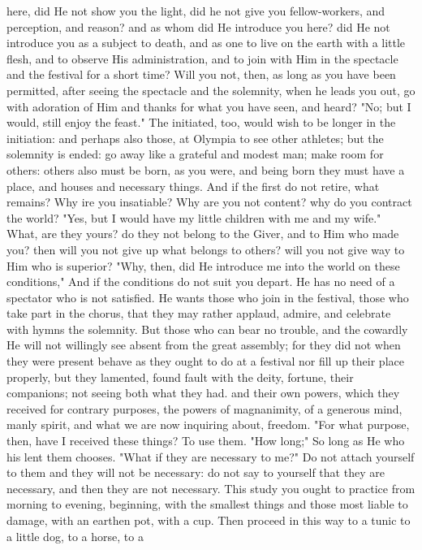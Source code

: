 \documentclass[a4paper]{article}
\begin{document}
here, did He not show you the light, did he not give you fellow-workers, and
perception, and reason? and as whom did He introduce you here? did He not
introduce you as a subject to death, and as one to live on the earth with a
little flesh, and to observe His administration, and to join with Him in the
spectacle and the festival for a short time? Will you not, then, as long as you
have been permitted, after seeing the spectacle and the solemnity, when he
leads you out, go with adoration of Him and thanks for what you have seen, and
heard? "No; but I would, still enjoy the feast." The initiated, too, would wish
to be longer in the initiation: and perhaps also those, at Olympia to see other
athletes; but the solemnity is ended: go away like a grateful and modest man;
make room for others: others also must be born, as you were, and being born
they must have a place, and houses and necessary things. And if the first do
not retire, what remains? Why ire you insatiable? Why are you not content? why
do you contract the world? "Yes, but I would have my little children with me
and my wife." What, are they yours? do they not belong to the Giver, and to Him
who made you? then will you not give up what belongs to others? will you not
give way to Him who is superior? "Why, then, did He introduce me into the world
on these conditions," And if the conditions do not suit you depart. He has no
need of a spectator who is not satisfied. He wants those who join in the
festival, those who take part in the chorus, that they may rather applaud,
admire, and celebrate with hymns the solemnity. But those who can bear no
trouble, and the cowardly He will not willingly see absent from the great
assembly; for they did not when they were present behave as they ought to do at
a festival nor fill up their place properly, but they lamented, found fault
with the deity, fortune, their companions; not seeing both what they had. and
their own powers, which they received for contrary purposes, the powers of
magnanimity, of a generous mind, manly spirit, and what we are now inquiring
about, freedom. "For what purpose, then, have I received these things? To use
them. "How long;" So long as He who his lent them chooses. "What if they are
necessary to me?" Do not attach yourself to them and they will not be
necessary: do not say to yourself that they are necessary, and then they are
not necessary.
    This study you ought to practice from morning to evening, beginning, with
the smallest things and those most liable to damage, with an earthen pot, with
a cup. Then proceed in this way to a tunic to a little dog, to a horse, to a
\end{document}
